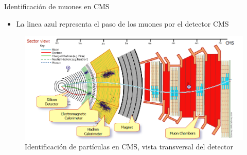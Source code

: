 \begin{frame}{Identificación de muones en CMS}

\begin{itemize}
    \item La linea azul representa el paso de los muones por el detector CMS
\end{itemize}

\begin{figure}
    \centering
    \includegraphics[scale=0.35]{Imag/reconstruccion_muones.png}
    \caption{Identificación de partículas en CMS, vista transversal del detector}
    \label{fig:my_label}
\end{figure}
    
\end{frame}

